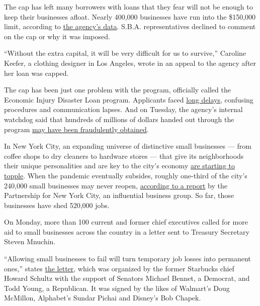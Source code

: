 The cap has left many borrowers with loans that they fear will not be
enough to keep their businesses afloat. Nearly 400,000 businesses have
run into the \$150,000 limit, according to
\href{https://www.sba.gov/funding-programs/loans/coronavirus-relief-options/economic-injury-disaster-loans\#section-header-5}{the
agency's data}. S.B.A. representatives declined to comment on the cap or
why it was imposed.

``Without the extra capital, it will be very difficult for us to
survive,'' Caroline Keefer, a clothing designer in Los Angeles, wrote in
an appeal to the agency after her loan was capped.

The cap has been just one problem with the program, officially called
the Economic Injury Disaster Loan program. Applicants faced
\href{https://www.nytimes.com/2020/04/09/business/smallbusiness/small-business-disaster-loans-coronavirus.html}{long
delays}, confusing procedures and communication lapses. And on Tuesday,
the agency's internal watchdog said that hundreds of millions of dollars
handed out through the program
\href{https://www.nytimes.com/live/2020/07/28/business/stock-market-today-coronavirus\#thieves-are-targeting-small-business-relief-programs-a-watchdog-says}{may
have been fraudulently obtained}.

In New York City, an expanding universe of distinctive small businesses
--- from coffee shops to dry cleaners to hardware stores --- that give
its neighborhoods their unique personalities and are key to the city's
economy
\href{https://www.nytimes.com/2020/08/03/nyregion/nyc-small-businesses-closing-coronavirus.html}{are
starting to topple}. When the pandemic eventually subsides, roughly
one-third of the city's 240,000 small businesses may never reopen,
\href{https://pfnyc.org/wp-content/uploads/2020/07/actionandcollaboration.pdf}{according
to a report} by the Partnership for New York City, an influential
business group. So far, those businesses have shed 520,000 jobs.

On Monday, more than 100 current and former chief executives called for
more aid to small businesses across the country in a letter sent to
Treasury Secretary Steven Mnuchin.

``Allowing small businesses to fail will turn temporary job losses into
permanent ones,'' states
\href{https://www.howardschultz.com/lettertocongress/}{the letter},
which was organized by the former Starbucks chief Howard Schultz with
the support of Senators Michael Bennet, a Democrat, and Todd Young, a
Republican. It was signed by the likes of Walmart's Doug McMillon,
Alphabet's Sundar Pichai and Disney's Bob Chapek.

